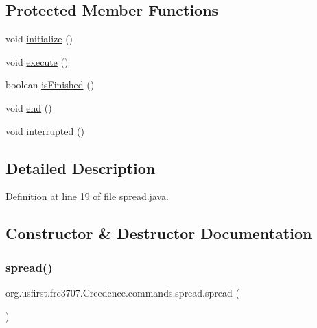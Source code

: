 \subsection*{Protected Member Functions}
\begin{DoxyCompactItemize}
\item 
void \mbox{\hyperlink{classorg_1_1usfirst_1_1frc3707_1_1_creedence_1_1commands_1_1spread_ac5a3c66b5caf47d763bb660394f33b9d}{initialize}} ()
\item 
void \mbox{\hyperlink{classorg_1_1usfirst_1_1frc3707_1_1_creedence_1_1commands_1_1spread_aeb2aa52f6d662ce31799da2abed384ed}{execute}} ()
\item 
boolean \mbox{\hyperlink{classorg_1_1usfirst_1_1frc3707_1_1_creedence_1_1commands_1_1spread_a4a51394a4b005db6e07b1d919a25e758}{is\+Finished}} ()
\item 
void \mbox{\hyperlink{classorg_1_1usfirst_1_1frc3707_1_1_creedence_1_1commands_1_1spread_acf4a8058b438b182bbfa6d2519d4b3ce}{end}} ()
\item 
void \mbox{\hyperlink{classorg_1_1usfirst_1_1frc3707_1_1_creedence_1_1commands_1_1spread_ab7a75c87d92f14f2a7555429643ea3f0}{interrupted}} ()
\end{DoxyCompactItemize}


\subsection{Detailed Description}


Definition at line 19 of file spread.\+java.



\subsection{Constructor \& Destructor Documentation}
\mbox{\label{classorg_1_1usfirst_1_1frc3707_1_1_creedence_1_1commands_1_1spread_a610ece691c55fa15046ee92a80b212f0}} 
\subsubsection{\texorpdfstring{spread()}{spread()}}
{\footnotesize\ttfamily org.\+usfirst.\+frc3707.\+Creedence.\+commands.\+spread.\+spread (\begin{DoxyParamCaption}{ }\end{DoxyParamCaption})}



